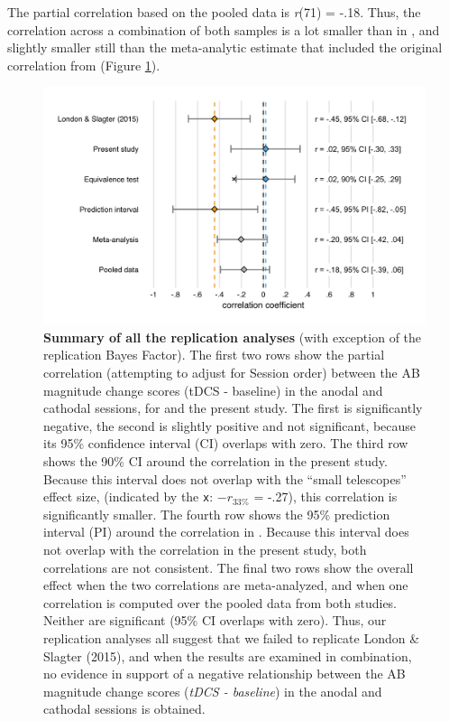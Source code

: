 \documentclass[11pt,]{memoir}
\begin{document}
The partial correlation based on the pooled data is \emph{r}(71) = -.18. Thus, the correlation across a combination of both samples is a lot smaller than in \textcite{London2015}, and slightly smaller still than the meta-analytic estimate that included the original correlation from \textcite{London2015} (Figure \ref{fig:fig-rep-estimate}).

\begin{figure}
\includegraphics[width=5.5in]{AB_tDCS_files/figures/figure_6_estimates} \caption{\textbf{Summary of all the replication analyses} (with exception of the replication Bayes Factor). The first two rows show the partial correlation (attempting to adjust for Session order) between the AB magnitude change scores (tDCS - baseline) in the anodal and cathodal sessions, for \textcite{London2015} and the present study. The first is significantly negative, the second is slightly positive and not significant, because its 95\% confidence interval (CI) overlaps with zero. The third row shows the 90\% CI around the correlation in the present study. Because this interval does not overlap with the ``small telescopes'' effect size, (indicated by the \texttt{x}: \(-r_{33\%}\) = -.27), this correlation is significantly smaller. The fourth row shows the 95\% prediction interval (PI) around the correlation in \textcite{London2015}. Because this interval does not overlap with the correlation in the present study, both correlations are not consistent. The final two rows show the overall effect when the two correlations are meta-analyzed, and when one correlation is computed over the pooled data from both studies. Neither are significant (95\% CI overlaps with zero). Thus, our replication analyses all suggest that we failed to replicate London \& Slagter (2015), and when the results are examined in combination, no evidence in support of a negative relationship between the AB magnitude change scores (\emph{tDCS - baseline}) in the anodal and cathodal sessions is obtained.}\label{fig:fig-rep-estimate}
\end{figure}
\end{document}

